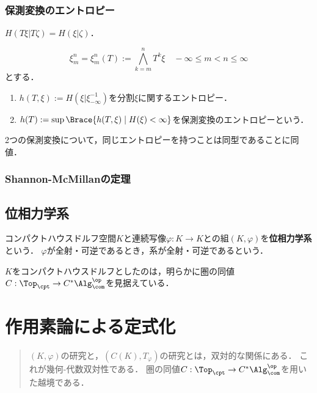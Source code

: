 \documentclass[uplatex,dvipdfmx]{jsreport}
\begin{document}
\subsection{保測変換のエントロピー}

\begin{proposition}
    $H(T\xi|T\zeta)=H(\xi|\zeta)$．
\end{proposition}

\begin{definition}
    \[\xi^n_m=\xi^n_m(T):=\bigwedge_{k=m}^nT^k\xi\quad-\infty\le m<n\le\infty\]
    とする．
    \begin{enumerate}
        \item $h(T,\xi):=H(\xi|\xi^{-1}_{-\infty})$を分割$\xi$に関するエントロピー．
        \item $h(T):=\sup\Brace{h(T,\xi)\mid H(\xi)<\infty}$を保測変換のエントロピーという．
    \end{enumerate}
\end{definition}

\begin{theorem}
    2つの保測変換について，同じエントロピーを持つことは同型であることに同値．
\end{theorem}

\subsection{Shannon-McMillanの定理}

\section{位相力学系}

\begin{definition}
    コンパクトハウスドルフ空間$K$と連続写像$\varphi:K\to K$との組$(K,\varphi)$を\textbf{位相力学系}という．
    $\varphi$が全射・可逆であるとき，系が全射・可逆であるという．
\end{definition}
\begin{remark}
    $K$をコンパクトハウスドルフとしたのは，明らかに圏の同値$C:\Top_\cpt\to C^*\Alg^\op_\com$を見据えている．
\end{remark}


\chapter{作用素論による定式化}

\begin{quotation}
    $(K,\varphi)$の研究と，$(C(K),T_\varphi)$の研究とは，双対的な関係にある．
    これが幾何-代数双対性である．
    圏の同値$C:\Top_\cpt\to C^*\Alg^\op_\com$を用いた越境である．
\end{quotation}
\end{document}
